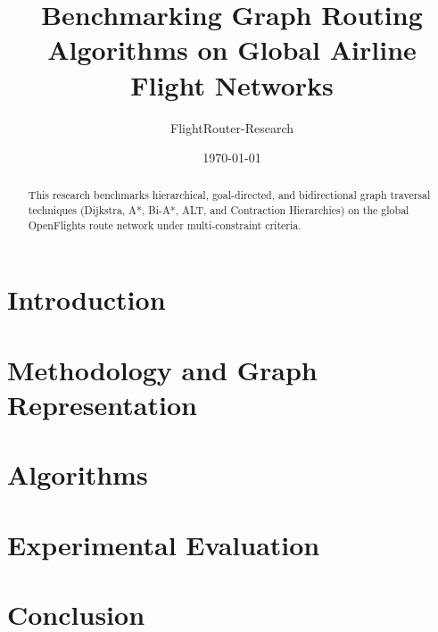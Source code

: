 \documentclass[10pt,twocolumn,letterpaper]{article}
\title{Benchmarking Graph Routing Algorithms on Global Airline Flight Networks}
\author{FlightRouter-Research}
\date{\today}
\begin{document}
\maketitle

\begin{abstract}
This research benchmarks hierarchical, goal-directed, and bidirectional graph traversal techniques (Dijkstra, A*, Bi-A*, ALT, and Contraction Hierarchies) on the global OpenFlights route network under multi-constraint criteria.
\end{abstract}

\section{Introduction}
\label{sec:intro}

\section{Methodology and Graph Representation}
\label{sec:methodology}

\section{Algorithms}
\label{sec:algorithms}

\section{Experimental Evaluation}
\label{sec:experiments}

\section{Conclusion}
\label{sec:conclusion}


\end{document}
